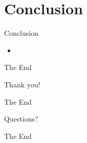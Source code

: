 \documentclass[hideothersubsections, t, aspectratio=1610]{beamer}
\begin{document}
\section{Conclusion}
\begin{frame}{Conclusion}
\begin{itemize}
\item
\end{itemize}

\end{frame}

\begin{frame}{The End}
\begin{center}
\Huge Thank you!
\end{center}
\end{frame}

\begin{frame}{The End}
\begin{center}
\Huge Questions?
\end{center}
\end{frame}

\begin{frame}
\Huge{\centerline{The End}}
\end{frame}

\clearpage



\end{document}
